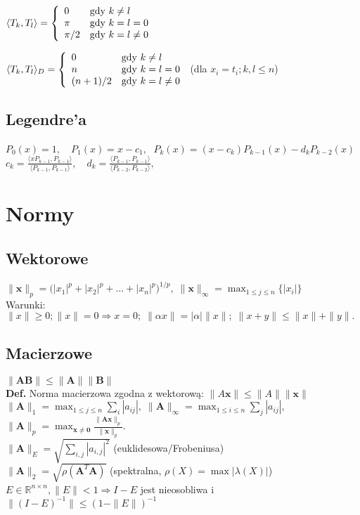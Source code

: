 \documentclass[a4paper,twocolumn]{article}
\begin{document}
$  \langle T_k, T_l \rangle = \left\{ \begin{array}{ll}
0 & \textrm{gdy $ k \neq l$}\\
\pi & \textrm{gdy $k=l=0$}\\
\pi/2 & \textrm{gdy $ k=l \neq 0 $}
\end{array} \right.$

$\langle T_k, T_l \rangle_{D} = \left\{ \begin{array}{ll}
0 & \textrm{gdy $ k \neq l$}\\
n & \textrm{gdy $k=l=0$}\\
(n+1)/2 & \textrm{gdy $ k=l \neq 0 $}
\end{array} \right.$ (dla $x_i = t_i; k,l \leq n$) 

\subsection{Legendre'a}
$P_0(x) = 1, \quad P_1(x) = x-c_1,\;$
 $   P_k(x) = (x-c_k)P_{k-1}(x) - d_k P_{k-2}(x) $\\
$
    c_k = \frac{\langle x P_{k-1}, P_{k-1} \rangle}{\langle P_{k-1}, P_{k-1} \rangle}, \quad
    d_k = \frac{\langle P_{k-1}, P_{k-1} \rangle}{\langle P_{k-2}, P_{k-2} \rangle},
$
\section{Normy}
\subsection{Wektorowe}
${\displaystyle \|\mathbf {x} \|_{p}={\bigl (}|x_{1}|^{p}+|x_{2}|^{p}+\ldots +|x_{n}|^{p}{\bigr )}^{1/p},\;\|\mathbf {x} \|_{\infty }=\max_{1 \leq j \leq n} {\bigl \{}|x_{i}| {\bigr \}}}$ \\
Warunki:\\
${\|x\|\geqslant 0; \displaystyle \|x\|=0\Rightarrow x=0;\; \|\alpha x\|=|\alpha |\|x\|;\;  \|x+y\|\leqslant \|x\|+\|y\|.}$
\subsection{Macierzowe}
${\displaystyle \|\mathbf {AB} \| \leq \|\mathbf {A} \| \|\mathbf {B} \|}$\\
\textbf{Def.} Norma macierzowa zgodna z wektorową: ${\displaystyle \|A \mathbf {x} \| \leq \| A \| \|\mathbf {x} \| }$
${\displaystyle \|\mathbf {A} \|_{1}=\max _{1 \leq j \leq n}\sum _{i}|a_{ij}|,\; \|\mathbf {A} \|_{\infty }=\max _{1\leq i\leq n}\sum _{j}|a_{ij}|,\;}$
${\displaystyle \|\mathbf {A} \|_{p}=\max _{\mathbf {x} \neq \mathbf {0} }{\tfrac {\|\mathbf {Ax} \|_{p}}{\|\mathbf {x} \|_{p}}}.}$\\
${\displaystyle \|\mathbf {A} \|_{E}=\sqrt{\sum_{i,j}|a_{i,j}|^2}}$ (euklidesowa/Frobeniusa)\\
${\displaystyle \|\mathbf {A} \|_{2}=\sqrt{\rho(\mathbf{A}^T\mathbf{A})}}$ (spektralna, $\rho(X) = \max |\lambda(X)|$)\\
$E \in \mathbb{R}^{n \times n}, \| E \| < 1 \Rightarrow I-E$ jest nieosobliwa i $\| (I-E)^{-1} \| \leq (1-\|E\|)^{-1}$
\end{document}
